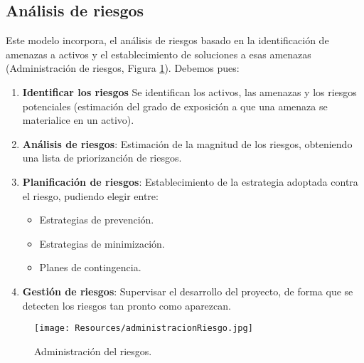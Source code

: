 \subsection{Análisis de riesgos}
Este modelo incorpora, el análisis de riesgos basado en la identificación de amenazas a activos y el establecimiento de soluciones a esas amenazas (Administración de riesgos, Figura \ref{fig:administracionRiesgo}). Debemos pues:
\begin{enumerate}
   \item \textbf{Identificar los riesgos} Se identifican los activos, las amenazas y los riesgos potenciales (estimación del grado de exposición a que una amenaza se materialice en un activo). %

   \item \textbf{Análisis de riesgos}: Estimación de la magnitud de los riesgos, obteniendo una lista de priorizanción de riesgos.

   \item \textbf{Planificación de riesgos}:
         Establecimiento de la estrategia adoptada contra el riesgo, pudiendo elegir entre:
         \begin{itemize}
            \item Estrategias de prevención.
            \item Estrategias de minimización.
            \item Planes de contingencia.
         \end{itemize}
   \item \textbf{Gestión de riesgos}: Supervisar el desarrollo del proyecto, de forma que se detecten los riesgos tan pronto como aparezcan.
\end{enumerate}

\begin{figure}[H]
   \centering
   \texttt{[image: Resources/administracionRiesgo.jpg]}
   \caption{Administración del riesgos.}
   \label{fig:administracionRiesgo}
\end{figure}


